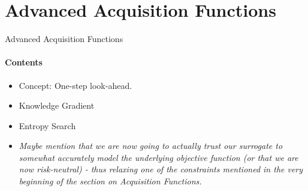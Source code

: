 \section{Advanced Acquisition Functions}
\begin{frame}[c]{Advanced Acquisition Functions}
\framesubtitle{Contents}
\begin{itemize}
    \item Concept: One-step look-ahead.
    \item Knowledge Gradient
    \item Entropy Search
    \item \emph{Maybe mention that we are now going to actually trust our surrogate to somewhat accurately model the underlying objective function (or that we are now risk-neutral) - thus relaxing one of the constraints mentioned in the very beginning of the section on Acquisition Functions.}
\end{itemize}
\end{frame}


